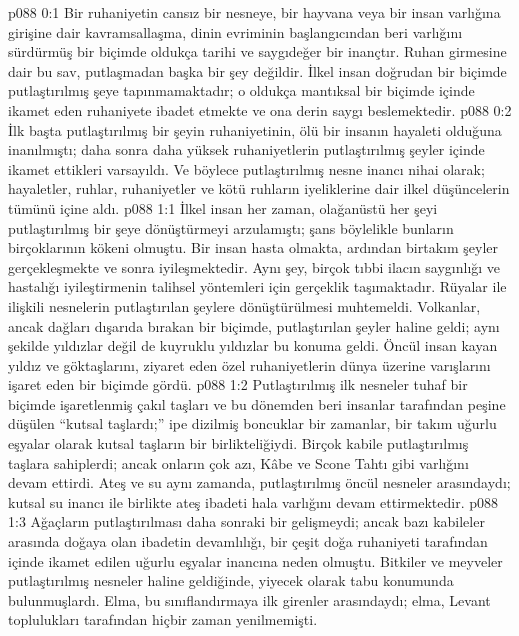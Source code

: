 \vs p088 0:1 Bir ruhaniyetin cansız bir nesneye, bir hayvana veya bir insan varlığına girişine dair kavramsallaşma, dinin evriminin başlangıcından beri varlığını sürdürmüş bir biçimde oldukça tarihi ve saygıdeğer bir inançtır. Ruhan girmesine dair bu sav, putlaşmadan başka bir şey değildir. İlkel insan doğrudan bir biçimde putlaştırılmış şeye tapınmamaktadır; o oldukça mantıksal bir biçimde içinde ikamet eden ruhaniyete ibadet etmekte ve ona derin saygı beslemektedir.
\vs p088 0:2 İlk başta putlaştırılmış bir şeyin ruhaniyetinin, ölü bir insanın hayaleti olduğuna inanılmıştı; daha sonra daha yüksek ruhaniyetlerin putlaştırılmış şeyler içinde ikamet ettikleri varsayıldı. Ve böylece putlaştırılmış nesne inancı nihai olarak; hayaletler, ruhlar, ruhaniyetler ve kötü ruhların iyeliklerine dair ilkel düşüncelerin tümünü içine aldı.
\vs p088 1:1 İlkel insan her zaman, olağanüstü her şeyi putlaştırılmış bir şeye dönüştürmeyi arzulamıştı; şans böylelikle bunların birçoklarının kökeni olmuştu. Bir insan hasta olmakta, ardından birtakım şeyler gerçekleşmekte ve sonra iyileşmektedir. Aynı şey, birçok tıbbi ilacın saygınlığı ve hastalığı iyileştirmenin talihsel yöntemleri için gerçeklik taşımaktadır. Rüyalar ile ilişkili nesnelerin putlaştırılan şeylere dönüştürülmesi muhtemeldi. Volkanlar, ancak dağları dışarıda bırakan bir biçimde, putlaştırılan şeyler haline geldi; aynı şekilde yıldızlar değil de kuyruklu yıldızlar bu konuma geldi. Öncül insan kayan yıldız ve göktaşlarını, ziyaret eden özel ruhaniyetlerin dünya üzerine varışlarını işaret eden bir biçimde gördü.
\vs p088 1:2 Putlaştırılmış ilk nesneler tuhaf bir biçimde işaretlenmiş çakıl taşları ve bu dönemden beri insanlar tarafından peşine düşülen “kutsal taşlardı;” ipe dizilmiş boncuklar bir zamanlar, bir takım uğurlu eşyalar olarak kutsal taşların bir birlikteliğiydi. Birçok kabile putlaştırılmış taşlara sahiplerdi; ancak onların çok azı, Kâbe ve Scone Tahtı gibi varlığını devam ettirdi. Ateş ve su aynı zamanda, putlaştırılmış öncül nesneler arasındaydı; kutsal su inancı ile birlikte ateş ibadeti hala varlığını devam ettirmektedir.
\vs p088 1:3 Ağaçların putlaştırılması daha sonraki bir gelişmeydi; ancak bazı kabileler arasında doğaya olan ibadetin devamlılığı, bir çeşit doğa ruhaniyeti tarafından içinde ikamet edilen uğurlu eşyalar inancına neden olmuştu. Bitkiler ve meyveler putlaştırılmış nesneler haline geldiğinde, yiyecek olarak tabu konumunda bulunmuşlardı. Elma, bu sınıflandırmaya ilk girenler arasındaydı; elma, Levant toplulukları tarafından hiçbir zaman yenilmemişti.
